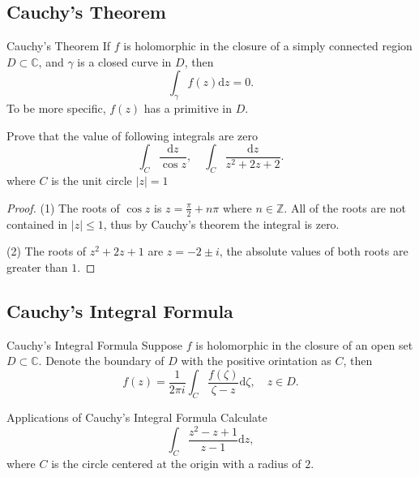 \subsection{Cauchy's Theorem}

\begin{theorem}{Cauchy's Theorem}{}
  If $f$ is holomorphic in the closure of a simply connected region $D \subset \mathbb{C}$,
  and $\gamma$ is a closed curve in $D$, then
  \begin{equation}
    \int_{\gamma} f(z)\mathrm{d} z = 0.
  \end{equation}
  To be more specific, $f(z)$ has a primitive in $D$.
\end{theorem}

\begin{example}{}{}
  Prove that the value of following integrals are zero
  \begin{equation}
    \int_C \frac{\mathrm{d} z}{\cos z}, \quad
    \int_C \frac{\mathrm{d} z}{z^2 + 2z + 2}.
  \end{equation}
  where $C$ is the unit circle $|z| = 1$
\end{example}

\begin{proof}
  (1) The roots of $\cos z$ is $z = \frac{\pi}{2} + n\pi$ where $n \in \mathbb{Z}$.
  All of the roots are not contained in $|z| \leq 1$, thus by Cauchy's theorem the integral is zero.

  (2) The roots of $z^2 + 2z + 1$ are $z = -2 \pm i$, the absolute values of both roots are greater than $1$.
\end{proof}


\subsection{Cauchy's Integral Formula}

\begin{theorem}{Cauchy's Integral Formula}{}
  Suppose $f$ is holomorphic in the closure of an open set $D \subset \mathbb{C}$.
  Denote the boundary of $D$ with the positive orintation as $C$, then
  \begin{equation}
    f(z) = \frac{1}{2 \pi i} \int_C \frac{f(\zeta)}{\zeta - z}\mathrm{d} \zeta, \quad
    z \in D.
  \end{equation}
\end{theorem}

\begin{example}{Applications of Cauchy's Integral Formula}{}
  Calculate
  \begin{equation}
    \int_C \frac{z^2 - z + 1}{z - 1}\mathrm{d} z,
  \end{equation}
  where $C$ is the circle centered at the origin with a radius of $2$.
\end{example}

